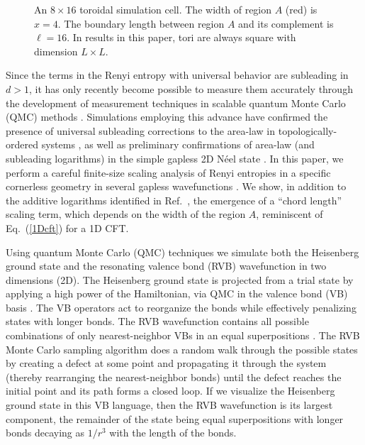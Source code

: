 \documentclass[prl,aps,twocolumn,floatfix,amsmath,amssymb,superscriptaddress,tightenlines]{revtex4}
\begin{document}
 \begin{figure}[ht]
   \begin{center}
   \end{center}
   \caption{An $8 \times 16$ toroidal simulation cell.  The width of region $A$ (red) is $x=4$.  The boundary length between region $A$ and its complement is $\ell = 16$.  In results in this paper, tori are always square with dimension $L \times L$. }
   \label{fig:torus}
 \end{figure}
 
Since the terms in the Renyi entropy with
universal behavior are subleading in $d>1$, it has only recently become
possible to measure them accurately through the development of measurement
techniques in scalable quantum Monte
Carlo (QMC) methods \cite{swap,XXZ}.  Simulations employing this advance
have confirmed the presence of universal subleading corrections to the
area-law in topologically-ordered systems \cite{isakov}, as well as preliminary
confirmations of area-law (and subleading logarithms) in the simple
gapless 2D N\'eel state \cite{HeisLog}. %
In this paper, we perform a careful
finite-size scaling analysis of Renyi entropies in a specific
cornerless geometry in several gapless wavefunctions \cite{Misguich}.  We show, in
addition to the additive logarithms identified in Ref.~\cite{HeisLog},
the emergence of a ``chord length'' scaling term, which depends on the
width of the region $A$, reminiscent of Eq.~(\ref{1Dcft}) for a 1D
CFT.

Using quantum Monte Carlo (QMC) techniques we simulate both the
Heisenberg ground state and the resonating valence bond (RVB)
wavefunction in two dimensions (2D).  The Heisenberg ground state is
projected from a trial state by applying a high power of the
Hamiltonian, via QMC in the valence bond (VB)
basis \cite{Sandvik}. The VB operators act to reorganize the
bonds while effectively penalizing states with longer bonds.  The RVB
wavefunction contains all possible combinations of only
nearest-neighbor VBs in an equal superpositions \cite{RVB1,RVB2}.  The RVB 
Monte Carlo sampling
algorithm does a random walk through the possible states by creating a
defect at some point and propagating it through the system (thereby
rearranging the nearest-neighbor bonds) until the defect reaches the
initial point and its path forms a closed loop.
If we visualize the Heisenberg ground state in this VB language, then the RVB wavefunction is its largest component, the remainder of the state being equal superpositions with longer bonds decaying as $1/r^3$ \cite{Sandvik} with the length of the bonds.
\end{document}
